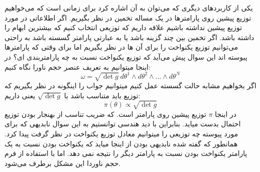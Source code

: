 یکی از کاربردهای دیگری که می‌توان به آن اشاره کرد برای زمانی است که می‌خواهیم توزیع پیشین روی پارامترها در یک مساله تخمین در نظر بگیریم. اگر اطلاعاتی در مورد توزیع پیشین نداشته باشیم علاقه داریم که توزیعی انتخاب کنیم که بیشترین ابهام را داشته باشد. اگر تخمین بین چند گزینه باشد یا به عبارتی پارامتر گسسته باشد به راحتی می‌توانیم توزیع یکنواخت را برای آن ها در نظر بگیریم اما برای وقتی که پارامترها پیوسته اند این سوال پیش می‌آید که توزیع یکنواخت نسبت به چه پارامتربندی ای؟ در اینجا میتوانیم به تعریف عنصر حجم ناورا نگاه کنیم:
\begin{equation}
    \omega=\sqrt{\det g}\ d\theta^1\wedge d\theta^2\wedge \dots \wedge d\theta^N
\end{equation}
اگر بخواهیم مشابه حالت گسسته عمل کنیم میتوانیم جواب را اینگونه در نظر بگیریم که توزیع باید متناسب باشد با $\sqrt{\det g}$ یعنی داریم:
\begin{equation}
    \pi(\theta)\propto \sqrt{\det g}
\end{equation}
در اینجا $\pi$ توزیع پیشین روی پارامتر است. که ضریب تناسب از بهنجار بودن توزیع احتمال بدست میاید.
بنابراین با دید هندسی توانستیم به این سوال نابدیهی که برای مورد پیوسته چه توزیعی را میتوانیم معادل توزیع یکنواخت در نظر گرفت پیدا کرد. همانطور که گفته شده نابدیهی بودن از اینجا میاید که یکنواخت بودن نسبت به یک پارامتر یکنواخت بودن نسبت به پارامتر دیگر را نتیجه نمی دهد. اما با استفاده از فرم حجم ناوردا این مشکل برطرف می‌شود.